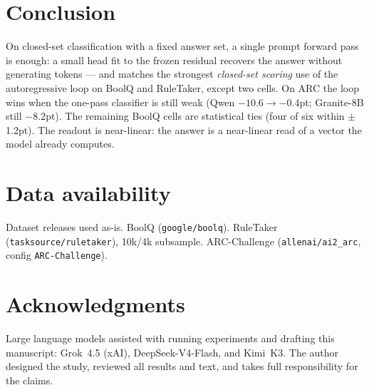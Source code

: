 \section{Conclusion}

On closed-set classification with a fixed answer set, a single prompt forward
pass is enough: a small \head{} head fit to the frozen residual recovers the
answer without generating tokens --- and matches the strongest
\emph{closed-set scoring} use of the autoregressive loop on BoolQ and
RuleTaker, except two cells. On ARC the loop wins when the one-pass
classifier is still weak (Qwen $-10.6 \to -0.4$pt; Granite-8B still $-8.2$pt).
The remaining BoolQ cells are statistical ties (four of six within
$\pm$1.2pt). The readout is near-linear: the answer is a near-linear read of
a vector the model already computes.

\section*{Data availability}
Dataset releases used as-is. BoolQ \citep{clark2019boolq}
(\texttt{google/boolq}). RuleTaker \citep{clark2020ruletaker}
(\texttt{tasksource/ruletaker}), 10k/4k subsample. ARC-Challenge
\citep{clark2018arc} (\texttt{allenai/ai2\_arc}, config
\texttt{ARC-Challenge}).

\ifdefined\AnonymousVersion
\else
\section*{Acknowledgments}
Large language models assisted with running experiments and drafting this
manuscript: Grok~4.5 (xAI), DeepSeek-V4-Flash, and Kimi~K3. The author
designed the study, reviewed all results and text, and takes full
responsibility for the claims.
\fi



\clearpage
\begingroup
\raggedright


\endgroup
